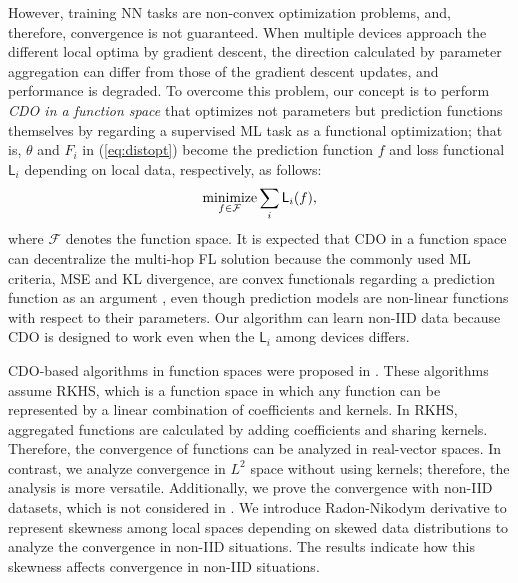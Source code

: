 \documentclass[journal]{IEEEtran}
\begin{document}
However, training \gls{NN} tasks are non-convex optimization problems, and, therefore, convergence is not guaranteed.
When multiple devices approach the different local optima by gradient descent,
the direction calculated by parameter aggregation can differ from those of the gradient descent updates,
and performance is degraded.
To overcome this problem,
our concept is to perform \textit{\gls{CDO} in a function space} that optimizes not parameters but prediction functions themselves
by regarding a supervised \gls{ML} task as a functional optimization;
that is, $\theta$ and $F_i$ in (\ref{eq:distopt}) become the prediction function $f$ and loss functional $\mathsf{L}_i$ depending on local data, respectively, as follows:
\begin{align}
  \operatorname*{minimize}_{f\in\mathcal{F}} \sum_i \mathsf{L}_i(f),
\end{align}
where $\mathcal{F}$ denotes the function space.
It is expected that \gls{CDO} in a function space can decentralize the multi-hop \gls{FL} solution
because the commonly used \gls{ML} criteria, \gls{MSE} and \gls{KL} divergence, are convex functionals regarding a prediction function as an argument \cite{van2014renyi},
even though prediction models are non-linear functions with respect to their parameters.
Our algorithm can learn non-\gls{IID} data
because \gls{CDO} is designed to work even when the $\mathsf{L}_i$ among devices differs.

\Gls{CDO}-based algorithms in function spaces were proposed in \cite{koppel2018decentralized,richards2020decentralised,xu2019coke,shen2021distributed}.
These algorithms assume \gls{RKHS}, which is a function space in which any function can be represented by a linear combination of coefficients and kernels.
In \gls{RKHS}, aggregated functions are calculated by adding coefficients and sharing kernels.
Therefore, the convergence of functions can be analyzed in real-vector spaces.
In contrast, we analyze convergence in $L^2$ space without using kernels;
therefore, the analysis is more versatile.
Additionally, we prove the convergence with non-\gls{IID} datasets, which is not considered in \cite{koppel2018decentralized,richards2020decentralised,xu2019coke,shen2021distributed}.
We introduce Radon-Nikodym derivative to represent skewness among local spaces depending on skewed data distributions
to analyze the convergence in non-\gls{IID} situations.
The results indicate how this skewness affects convergence in non-\gls{IID} situations.
\end{document}
